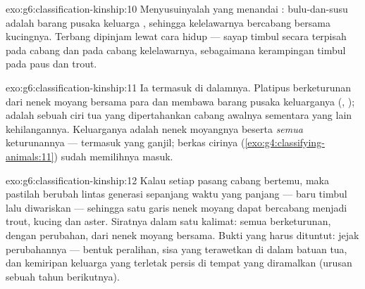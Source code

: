 \begin{solution}{exo:g6:classification-kinship:10}
Menyusuinyalah yang menandai : bulu-dan-susu adalah barang
pusaka keluarga , sehingga kelelawarnya bercabang bersama
kucingnya. Terbang dipinjam lewat cara hidup --- sayap timbul secara
terpisah pada cabang  dan pada cabang kelelawarnya,
sebagaimana kerampingan timbul pada paus dan  trout.
\end{solution}

\begin{solution}{exo:g6:classification-kinship:11}
Ia termasuk di dalamnya. Platipus berketurunan dari nenek moyang
bersama para  dan membawa barang pusaka keluarganya (,
);  adalah sebuah ciri tua yang dipertahankan cabang
awalnya sementara yang lain kehilangannya. Keluarganya adalah nenek
moyangnya beserta \emph{semua} keturunannya --- termasuk yang ganjil;
berkas cirinya (\cref{exo:g4:classifying-animals:11}) sudah memilihnya
masuk.
\end{solution}

\begin{solution}{exo:g6:classification-kinship:12}
Kalau setiap pasang cabang bertemu, maka  pastilah berubah
lintas generasi sepanjang waktu yang panjang ---  baru timbul
lalu diwariskan --- sehingga satu garis nenek moyang dapat bercabang
menjadi  trout, kucing dan  aster. Siratnya dalam satu
kalimat: semua  berketurunan, dengan perubahan, dari
nenek moyang bersama. Bukti yang harus dituntut: jejak perubahannya
--- bentuk peralihan, sisa yang terawetkan di dalam batuan tua, dan
kemiripan keluarga yang terletak persis di tempat yang diramalkan
 (urusan sebuah tahun berikutnya).
\end{solution}

